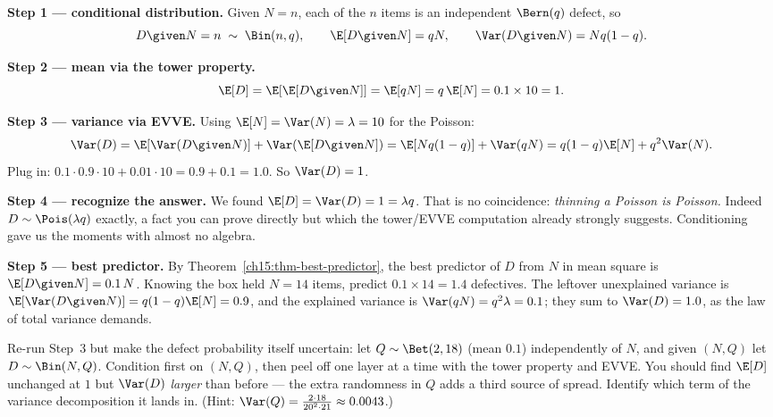 \textbf{Step 1 --- conditional distribution.} Given $N = n$, each of the $n$ items is an independent
$\Bern(q)$ defect, so
\[
  D \given N = n \;\sim\; \Bin(n, q),
  \qquad \E[D\given N] = qN, \qquad \Var(D\given N) = N q (1-q).
\]

\textbf{Step 2 --- mean via the tower property.}
\[
  \E[D] = \E[\E[D\given N]] = \E[qN] = q\,\E[N] = 0.1 \times 10 = 1.
\]

\textbf{Step 3 --- variance via EVVE.} Using $\E[N] = \Var(N) = \lambda = 10$ for the Poisson:
\[
  \Var(D) = \E[\Var(D\given N)] + \Var(\E[D\given N])
          = \E[Nq(1-q)] + \Var(qN)
          = q(1-q)\E[N] + q^2 \Var(N).
\]
Plug in: $0.1\cdot 0.9\cdot 10 + 0.01\cdot 10 = 0.9 + 0.1 = 1.0$. So $\Var(D) = 1$.

\textbf{Step 4 --- recognize the answer.} We found $\E[D] = \Var(D) = 1 = \lambda q$. That is no
coincidence: \emph{thinning a Poisson is Poisson.} Indeed $D \sim \Pois(\lambda q)$ exactly, a fact you
can prove directly but which the tower/EVVE computation already strongly suggests. Conditioning gave us
the moments with almost no algebra.

\textbf{Step 5 --- best predictor.} By Theorem~\ref{ch15:thm-best-predictor}, the best predictor of $D$
from $N$ in mean square is $\E[D\given N] = 0.1\,N$. Knowing the box held $N = 14$ items, predict
$0.1 \times 14 = 1.4$ defectives. The leftover unexplained variance is $\E[\Var(D\given N)] =
q(1-q)\E[N] = 0.9$, and the explained variance is $\Var(qN) = q^2\lambda = 0.1$; they sum to
$\Var(D) = 1.0$, as the law of total variance demands.

\begin{labbox}
Re-run Step~3 but make the defect probability itself uncertain: let $Q \sim \Bet(2, 18)$ (mean $0.1$)
independently of $N$, and given $(N, Q)$ let $D \sim \Bin(N, Q)$. Condition first on $(N, Q)$, then peel
off one layer at a time with the tower property and EVVE. You should find $\E[D]$ unchanged at $1$ but
$\Var(D)$ \emph{larger} than before --- the extra randomness in $Q$ adds a third source of spread.
Identify which term of the variance decomposition it lands in. (Hint: $\Var(Q) = \frac{2\cdot 18}
{20^2\cdot 21} \approx 0.0043$.)
\end{labbox}


